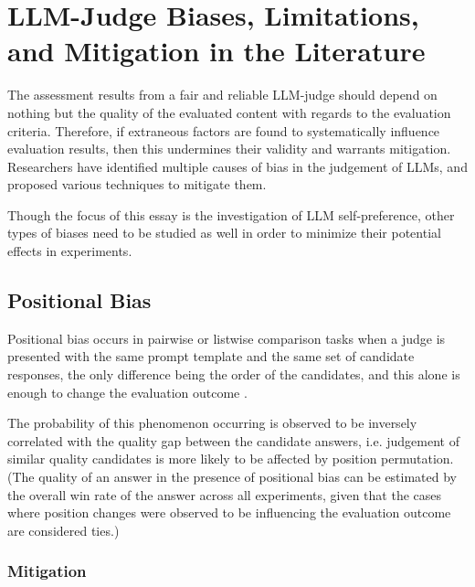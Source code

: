 \documentclass[UTF8,noindent,nohyp,parspace,titlepage,twoside,12pt]{article}
\begin{document}
  \section{LLM-Judge Biases, Limitations, and Mitigation in the Literature}

    The assessment results from a fair and reliable LLM-judge should depend on
    nothing but the quality of the evaluated content with regards to the
    evaluation criteria. Therefore, if extraneous factors are found to
    systematically influence evaluation results, then this undermines their
    validity and warrants mitigation. Researchers have identified multiple
    causes of bias in the judgement of LLMs, and proposed various techniques
    to mitigate them.

    Though the focus of this essay is the investigation of LLM self-preference,
    other types of biases need to be studied as well in order to minimize their
    potential effects in experiments.

    \subsection{Positional Bias}

      Positional bias occurs in pairwise or listwise comparison tasks when a
      judge is presented with the same prompt template and the same set of
      candidate responses, the only difference being the order of the candidates,
      and this alone is enough to change the evaluation outcome
      \cite{biaspos,notfair}.

      The probability of this phenomenon occurring is observed to be inversely
      correlated with the quality gap between the candidate answers, i.e.
      judgement of similar quality candidates is more likely to be affected by
      position permutation. (The quality of an answer in the presence of
      positional bias can be estimated by the overall win rate of the answer
      across all experiments, given that the cases where position changes
      were observed to be influencing the evaluation outcome are considered
      ties.)

      \subsubsection{Mitigation}
\end{document}
